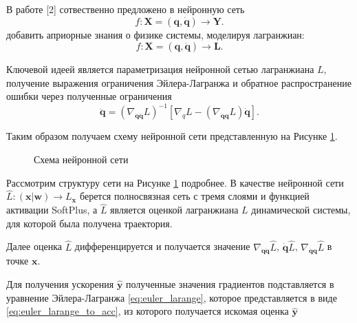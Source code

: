 \documentclass[a4paper, 12pt]{article}
\begin{document}
В работе [2] сотвественно предложено в нейронную сеть 
\begin{equation}
f: \mathbf{X} = (\mathbf{q}, \mathbf{\dot{q}}) \rightarrow \mathbf{Y}.
\end{equation}
 добавить априорные знания о физике системы, моделируя лагранжиан:
\begin{equation}
f: \mathbf{X} = (\mathbf{q}, \mathbf{\dot{q}}) \rightarrow \mathbf{L}.
\end{equation}

Ключевой идеей является параметризация нейронной сетью лагранжиана $L$, получение выражения ограничения Эйлера-Лагранжа и обратное распространение ошибки через полученные ограничения
\begin{equation}
\ddot{\mathbf{q}} =\left(\nabla_{\dot{\mathbf{q}} \dot{\mathbf{q}}} L\right)^{-1}\left[\nabla_{q} L-\left(\nabla_{\dot{\mathbf{q}}\mathbf{q}} L\right) \dot{\mathbf{q}}\right].
\label{eq:euler_larange_to_acc}
\end{equation}

Таким образом получаем схему нейронной сети представленную на Рисунке \ref{fig: LNN}. 

\begin{figure}[!htbp]
\centerline{
}
\caption{Схема нейронной сети}
\label{fig: LNN}
\end{figure}

Рассмотрим структуру сети на Рисунке \ref{fig: LNN} подробнее.
В качестве нейронной сети $\hat{L} \colon (\mathbf{x} | \mathbf{w}) \to L_\mathbf{x}$ берется полносвязная сеть с тремя слоями и функцией активации SoftPlus, а $\hat{L}$ является оценкой лагранжиана $L$ динамической системы, для которой была получена траектория. 

Далее оценка $\hat{L}$ дифференцируется и получается значение $\nabla_{\dot{\mathbf{q}} \dot{\mathbf{q}}} \hat{L}$, $\dot{\mathbf{q}} \hat{L}$, $\nabla_{\dot{\mathbf{q}}\mathbf{q}} \hat{L}$ в точке $\mathbf{x}$.

Для получения ускорения $\hat{\mathbf{y}}$ полученные значения градиентов подставляется в уравнение Эйлера-Лагранжа \eqref{eq:euler_larange}, которое представляется в виде \eqref{eq:euler_larange_to_acc}, из которого получается искомая оценка $\hat{\mathbf{y}}$
\end{document}
